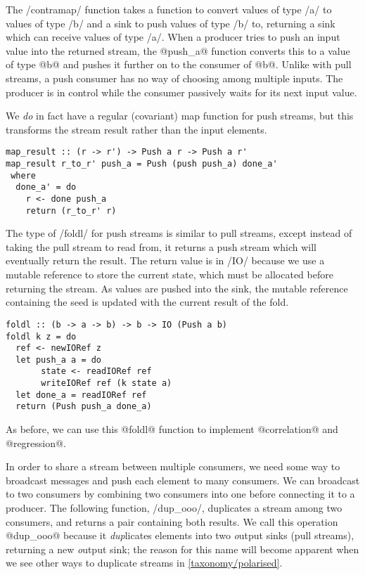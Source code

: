 The \Hs/contramap/ function takes a function to convert values of type \Hs/a/ to values of type \Hs/b/ and a sink to push values of type \Hs/b/ to, returning a sink which can receive values of type \Hs/a/.
When a producer tries to push an input value into the returned stream, the @push_a@ function converts this to a value of type @b@ and pushes it further on to the consumer of @b@.
Unlike with pull streams, a push consumer has no way of choosing among multiple inputs.
The producer is in control while the consumer passively waits for its next input value.

We \emph{do} in fact have a regular (covariant) map function for push streams, but this transforms the stream result rather than the input elements.

\begin{lstlisting}
map_result :: (r -> r') -> Push a r -> Push a r'
map_result r_to_r' push_a = Push (push push_a) done_a'
 where
  done_a' = do
    r <- done push_a
    return (r_to_r' r)
\end{lstlisting}

The type of \Hs/foldl/ for push streams is similar to pull streams, except instead of taking the pull stream to read from, it returns a push stream which will eventually return the result.
The return value is in \Hs/IO/ because we use a mutable reference to store the current state, which must be allocated before returning the stream.
As values are pushed into the sink, the mutable reference containing the seed is updated with the current result of the fold.

\begin{lstlisting}
foldl :: (b -> a -> b) -> b -> IO (Push a b)
foldl k z = do
  ref <- newIORef z
  let push_a a = do
       state <- readIORef ref
       writeIORef ref (k state a)
  let done_a = readIORef ref
  return (Push push_a done_a)
\end{lstlisting}

As before, we can use this @foldl@ function to implement @correlation@ and @regression@.

In order to share a stream between multiple consumers, we need some way to broadcast messages and push each element to many consumers.
We can broadcast to two consumers by combining two consumers into one before connecting it to a producer.
The following function, \Hs/dup_ooo/, duplicates a stream among two consumers, and returns a pair containing both results.
We call this operation @dup_ooo@ because it \emph{dup}licates elements into two \emph{o}utput sinks (pull streams), returning a new \emph{o}utput sink; the reason for this name will become apparent when we see other ways to duplicate streams in \autoref{taxonomy/polarised}.

